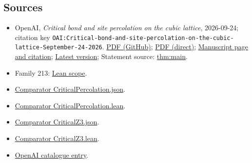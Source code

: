 \documentclass[11pt]{article}
\begin{document}
\subsection{Sources}
\begin{itemize}
\item OpenAI, \emph{Critical bond and site percolation on the cubic lattice}, 2026-09-24; citation key \texttt{OAI:Critical-bond-and-site-percolation-on-the-cubic-lattice-September-24-2026}. \href{https://github.com/openai/math/blob/adc7f1241b42e322a6451854ab7e4b4c146bf78a/preprints/Critical-bond-and-site-percolation-on-the-cubic-lattice-September-24-2026/paper.pdf}{PDF (GitHub)}; \href{https://github.com/openai/math/raw/adc7f1241b42e322a6451854ab7e4b4c146bf78a/preprints/Critical-bond-and-site-percolation-on-the-cubic-lattice-September-24-2026/paper.pdf}{PDF (direct)}; \href{https://github.com/openai/math/blob/adc7f1241b42e322a6451854ab7e4b4c146bf78a/preprints/Critical-bond-and-site-percolation-on-the-cubic-lattice-September-24-2026/README.md}{Manuscript page and citation}; \href{https://github.com/openai/math/blob/main/preprints/Critical-bond-and-site-percolation-on-the-cubic-lattice-September-24-2026/paper.pdf}{Latest version}; Statement source: \href{https://github.com/openai/math/blob/adc7f1241b42e322a6451854ab7e4b4c146bf78a/preprints/Critical-bond-and-site-percolation-on-the-cubic-lattice-September-24-2026/build/introduction.tex\#L17}{thm:main}.
\item Family 213: \href{https://github.com/openai/math/blob/adc7f1241b42e322a6451854ab7e4b4c146bf78a/lean/docs/213.md}{Lean scope}.
\item \href{https://github.com/openai/math/blob/adc7f1241b42e322a6451854ab7e4b4c146bf78a/lean/ComparatorChallenges/CriticalPercolation.json}{Comparator CriticalPercolation.json}.
\item \href{https://github.com/openai/math/blob/adc7f1241b42e322a6451854ab7e4b4c146bf78a/lean/ComparatorChallenges/CriticalPercolation.lean}{Comparator CriticalPercolation.lean}.
\item \href{https://github.com/openai/math/blob/adc7f1241b42e322a6451854ab7e4b4c146bf78a/lean/ComparatorChallenges/CriticalZ3.json}{Comparator CriticalZ3.json}.
\item \href{https://github.com/openai/math/blob/adc7f1241b42e322a6451854ab7e4b4c146bf78a/lean/ComparatorChallenges/CriticalZ3.lean}{Comparator CriticalZ3.lean}.
\item \href{https://github.com/openai/math/blob/adc7f1241b42e322a6451854ab7e4b4c146bf78a/CONTENTS.md}{OpenAI catalogue entry}.
\end{itemize}
\end{document}

